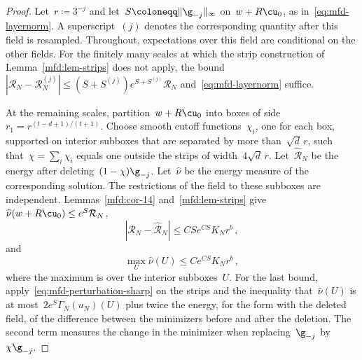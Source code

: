 \documentclass[11pt]{amsart}
\begin{document}
\begin{proof}
Let~$r\coloneqq3^{-j}$ and let~$S\coloneqq\|\g_{-j}\|_\infty$ on~$w+R\cu_0$, as in~\eqref{eq:mfd-layernorm}. A superscript~$(j)$ denotes the corresponding quantity after this field is resampled. Throughout, expectations over this field are conditional on the other fields. For the finitely many scales at which the strip construction of Lemma~\ref{mfd:lem-strips} does not apply, the bound~$|\mathcal R_N-\mathcal R_N^{(j)}|\leq(S+S^{(j)})e^{S+S^{(j)}}\mathcal R_N$ and~\eqref{eq:mfd-layernorm} suffice.

\smallskip

At the remaining scales, partition~$w+R\cu_0$ into boxes of side~$r_1=r^{(t-d+1)/(t+1)}$. Choose smooth cutoff functions~$\chi_i$, one for each box, supported on interior subboxes that are separated by more than~$\sqrt d\,r$, such that~$\chi=\sum_i\chi_i$ equals one outside the strips of width~$4\sqrt d\,r$. Let~$\widehat{\mathcal R}_N$ be the energy after deleting~$(1-\chi)\g_{-j}$. Let~$\widehat\nu$ be the energy measure of the corresponding solution. The restrictions of the field to these subboxes are independent. Lemmas~\ref{mfd:cor-14} and~\ref{mfd:lem-strips} give~$\widehat\nu(w+R\cu_0)\leq e^S\mathcal R_N$,
\begin{equation*}
	|\mathcal R_N-\widehat{\mathcal R}_N|\leq CSe^{CS}K_Nr^b\,,
\end{equation*}
and
\begin{equation*}
	\max_U\widehat\nu(U)\leq Ce^{CS}K_Nr^b\,,
\end{equation*}
where the maximum is over the interior subboxes~$U$. For the last bound, apply~\eqref{eq:mfd-perturbation-sharp} on the strips and the inequality that~$\widehat\nu(U)$ is at most~$2e^S\Gamma_N(u_N)(U)$ plus twice the energy, for the form with the deleted field, of the difference between the minimizers before and after the deletion. The second term measures the change in the minimizer when replacing~$\g_{-j}$ by~$\chi\g_{-j}$.

\smallskip


\end{proof}
\end{document}
